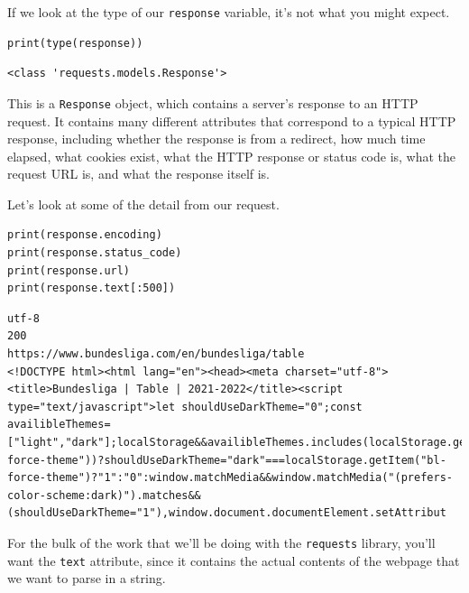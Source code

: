 If we look at the type of our \verb|response| variable, it's not what you might expect.\par
\begin{lstlisting}[style=pippython]
print(type(response))
\end{lstlisting}
\begin{lstlisting}[style=none]
<class 'requests.models.Response'>
\end{lstlisting}
This is a \verb|Response| object, which contains a server's response to an HTTP request. It contains many different attributes that correspond to a typical HTTP response, including whether the response is from a redirect, how much time elapsed, what cookies exist, what the HTTP response or status code is, what the request URL is, and what the response itself is.\par
Let's look at some of the detail from our request.\par
\begin{lstlisting}[style=pippython]
print(response.encoding)
print(response.status_code)
print(response.url)
print(response.text[:500])
\end{lstlisting}
\begin{lstlisting}[style=none]
utf-8
200
https://www.bundesliga.com/en/bundesliga/table
<!DOCTYPE html><html lang="en"><head><meta charset="utf-8"><title>Bundesliga | Table | 2021-2022</title><script type="text/javascript">let shouldUseDarkTheme="0";const availibleThemes=["light","dark"];localStorage&&availibleThemes.includes(localStorage.getItem("bl-force-theme"))?shouldUseDarkTheme="dark"===localStorage.getItem("bl-force-theme")?"1":"0":window.matchMedia&&window.matchMedia("(prefers-color-scheme:dark)").matches&&(shouldUseDarkTheme="1"),window.document.documentElement.setAttribut
\end{lstlisting}
For the bulk of the work that we'll be doing with the \verb|requests| library, you'll want the \verb|text| attribute, since it contains the actual contents of the webpage that we want to parse in a string.\par

